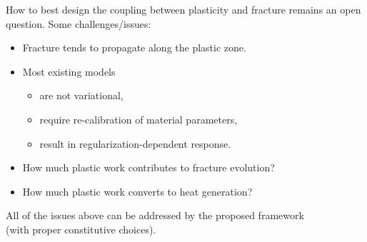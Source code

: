 \begin{frame}
\begin{columns}
\begin{column}{0.8\textwidth}
      How to best design the \textcolor{peggyblue}{coupling} between plasticity and fracture remains an open question. Some challenges/issues:
      \begin{itemize}
        \item Fracture tends to propagate along the plastic zone.
              \pause
        \item Most existing models
              \begin{itemize}
                \item are not variational,
                      \pause
                \item require \textcolor{peggyblue}{re-calibration} of material parameters,
                      \pause
                \item result in \textcolor{peggyblue}{regularization-dependent} response.
                      \pause
              \end{itemize}
        \item How much plastic work contributes to \textcolor{peggyblue}{fracture evolution}?
              \pause
        \item How much plastic work converts to \textcolor{peggyblue}{heat generation}?
      \end{itemize}
      
      \bigskip
      \pause
      
      \begin{block}{}
        \centering
        \vspace{1em}
        All of the issues above can be addressed by the proposed framework \\
        (with proper constitutive choices).
        \vspace{1em}
      \end{block}
    \end{column}
  \end{columns}
\end{frame}

